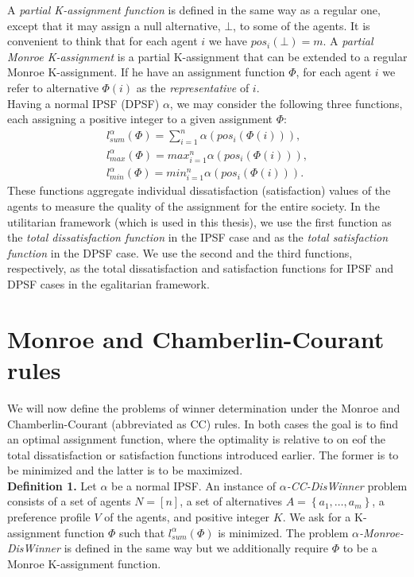 A \textit{partial K-assignment function} is defined in the same way as a regular one, except that it may assign a null alternative, $\bot$, to some of the agents. It is convenient to think that for each agent $i$ we have $pos_{i}(\bot) = m$. A \textit{partial Monroe K-assignment} is a partial K-assignment that can be extended to a regular Monroe K-assignment. If he have an assignment function $\Phi$, for each agent $i$ we refer to alternative $\Phi(i)$ as the \textit{representative} of $i$.
\\

Having a normal IPSF (DPSF) $\alpha$, we may consider the following three functions, each assigning a positive integer to a given assignment $\Phi$:
\begin{gather}
	l^{\alpha}_{sum}(\Phi) = \sum^{n}_{i=1} \alpha (pos_{i}(\Phi(i))),\\
	l^{\alpha}_{max}(\Phi) = max^{n}_{i=1} \alpha (pos_{i}(\Phi(i))),\\
	l^{\alpha}_{min}(\Phi) = min^{n}_{i=1} \alpha (pos_{i}(\Phi(i))).
\end{gather}
These functions aggregate individual dissatisfaction (satisfaction) values of the agents to measure the quality of the assignment for the entire society. In the utilitarian framework (which is used in this thesis), we use the first function as the \textit{total dissatisfaction function} in the IPSF case and as the \textit{total satisfaction function} in the DPSF case. We use the second and the third functions, respectively, as the total dissatisfaction and satisfaction functions for IPSF and DPSF cases in the egalitarian framework.

\section{Monroe and Chamberlin-Courant rules}

We will now define the problems of winner determination under the Monroe and Chamberlin-Courant (abbreviated as CC) rules. In both cases the goal is to find an optimal assignment function, where the optimality is relative to on eof the total dissatisfaction or satisfaction functions introduced earlier. The former is to be minimized and the latter is to be maximized.
\\

\noindent
\textbf{Definition 1.} Let $\alpha$ be a normal IPSF. An instance of $\alpha$\textit{-CC-DisWinner} problem consists of a set of agents $N = [n]$, a set of alternatives $A = \left\{ a_{1}, \ldots, a_{m} \right\}$, a preference profile $V$ of the agents, and positive integer $K$. We ask for a K-assignment function $\Phi$ such that $l^{\alpha}_{sum}(\Phi)$ is minimized. The problem $\alpha$\textit{-Monroe-DisWinner} is defined in the same way but we additionally require $\Phi$ to be a Monroe K-assignment function.
\\

